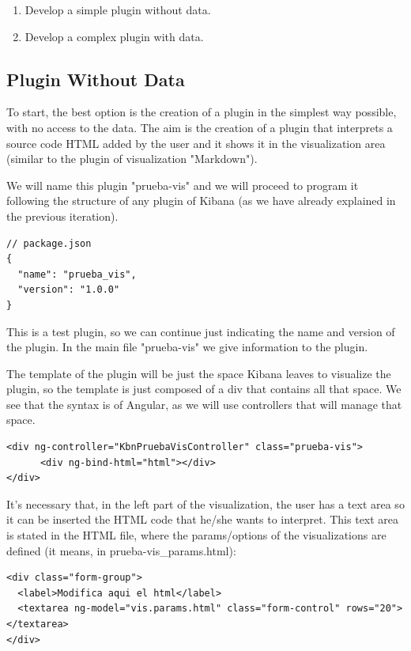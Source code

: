 \documentclass[a4paper, 12pt]{book}
\begin{document}
\begin{enumerate}
\item Develop a simple plugin without data.
\item Develop a complex plugin with data.
\end{enumerate}

\subsection{Plugin Without Data}

To start, the best option is the creation of a plugin in the simplest way possible, with no access to the data. The aim is the creation of a plugin that interprets a source code HTML added by the user and it shows it in the visualization area (similar to the plugin of visualization "Markdown"). 

We will name this plugin "prueba-vis" and we will proceed to program it following the structure of any plugin of Kibana (as we have already explained in the previous iteration).

\begin{lstlisting}[frame=single]
// package.json
{
  "name": "prueba_vis",
  "version": "1.0.0"
}
\end{lstlisting}

This is a test plugin, so we can continue just indicating the name and version of the plugin. In the main file "prueba-vis" we give information to the plugin.

The template of the plugin will be just the space Kibana leaves to visualize the plugin, so the template is just composed of a div that contains all that space. We see that the syntax is of Angular, as we will use controllers that will manage that space.

\begin{lstlisting}[frame=single]
<div ng-controller="KbnPruebaVisController" class="prueba-vis">
      <div ng-bind-html="html"></div>
</div>
\end{lstlisting}

It’s necessary that, in the left part of the visualization, the user has a text area so it can be inserted the HTML code that he/she wants to interpret. This text area is stated in the HTML file, where the params/options of the visualizations are defined (it means, in prueba-vis\_params.html):

\begin{lstlisting}[frame=single]
<div class="form-group">
  <label>Modifica aqui el html</label>
  <textarea ng-model="vis.params.html" class="form-control" rows="20"></textarea>
</div>
\end{lstlisting}
\end{document}
